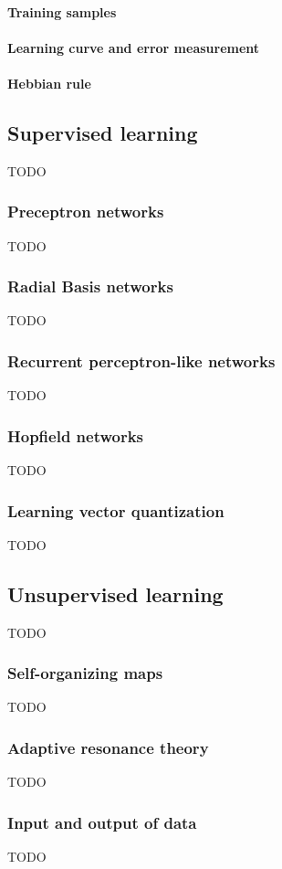 \documentclass[pdftex,a4paper,12pt,twoside]{report}
\theoremstyle{plain} \newtheorem{theorem}{Theorem} \newtheorem{proposition}{Proposition} \newtheorem{lemma}{Lemma} \newtheorem*{corollary}{Corollary}
\theoremstyle{definition} \newtheorem{definition}{Definition} \newtheorem{conjecture}{Conjecture} \newtheorem*{example}{Example} \newtheorem{algorithm}{Algorithm}
\theoremstyle{remark} \newtheorem*{remark}{Remark} \newtheorem*{note}{Note} \newtheorem{case}{Case}
\begin{document}
\paragraph{Training samples}
\paragraph{Learning curve and error measurement}
\paragraph{Hebbian rule}
\subsection{Supervised learning}
TODO
\subsubsection{Preceptron networks}
TODO
\subsubsection{Radial Basis networks}
TODO
\subsubsection{Recurrent perceptron-like networks}
TODO
\subsubsection{Hopfield networks}
TODO
\subsubsection{Learning vector quantization}
TODO
\subsection{Unsupervised learning}
TODO
\subsubsection{Self-organizing maps}
TODO
\subsubsection{Adaptive resonance theory}
TODO
\subsubsection{Input and output of data}
TODO
\end{document}
